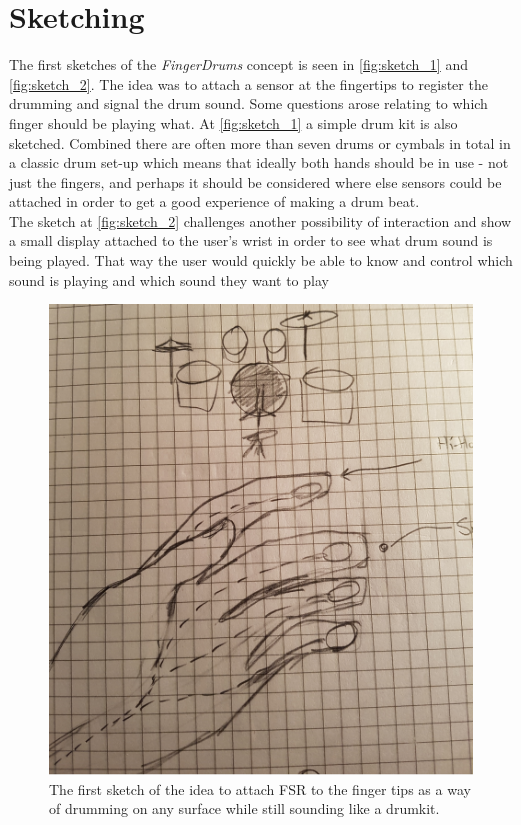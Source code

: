 \section{Sketching}
The first sketches of the \textit{FingerDrums} concept is seen in \autoref{fig:sketch_1} and \autoref{fig:sketch_2}. The idea was to attach a sensor at the fingertips to register the drumming and signal the drum sound. Some questions arose relating to which finger should be playing what. At \autoref{fig:sketch_1} a simple drum kit is also  sketched. Combined there are often more than seven drums or cymbals in total in a classic drum set-up which means that ideally both hands should be in use - not just the fingers, and perhaps it should be considered where else sensors could be attached in order to get a good experience of making a drum beat.\\
The sketch at \autoref{fig:sketch_2} challenges another possibility of interaction and show a small display attached to the user's wrist in order to see what drum sound is being played. That way the user would quickly be able to know and control which sound is playing and which sound they want to play
\begin{figure}
\centering
\includegraphics[scale=0.10]{Figure/sketch_1.jpg}
\caption{The first sketch of the idea to attach FSR to the finger tips as a way of drumming on any surface while still sounding like a drumkit.}
\label{fig:sketch_1}
\end{figure}



